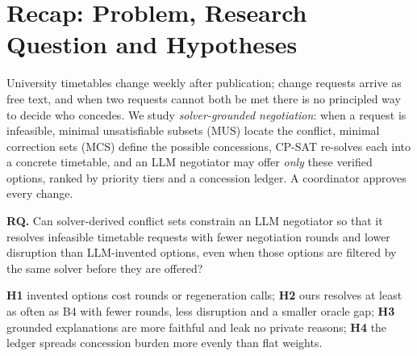 \documentclass[11pt,a4paper]{article}
\begin{document}
\section{Recap: Problem, Research Question and Hypotheses}
University timetables change weekly after publication; change requests arrive
as free text, and when two requests cannot both be met there is no principled
way to decide who concedes. We study \emph{solver-grounded negotiation}: when a
request is infeasible, minimal unsatisfiable subsets (MUS) locate the conflict,
minimal correction sets (MCS) define the possible concessions, CP-SAT re-solves
each into a concrete timetable, and an LLM negotiator may offer \emph{only} these
verified options, ranked by priority tiers and a concession ledger. A coordinator
approves every change.

\begin{keybox}
\textbf{RQ.} Can solver-derived conflict sets constrain an LLM negotiator so
that it resolves infeasible timetable requests with fewer negotiation rounds and
lower disruption than LLM-invented options, even when those options are filtered
by the same solver before they are offered?
\end{keybox}
\noindent\textbf{H1} invented options cost rounds or regeneration calls;
\textbf{H2} ours resolves at least as often as B4 with fewer rounds, less disruption and a smaller
oracle gap; \textbf{H3} grounded explanations are more faithful and leak no private
reasons; \textbf{H4} the ledger spreads concession burden more evenly than flat weights.

\end{document}
